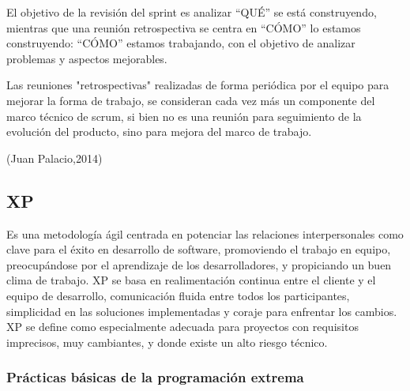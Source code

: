 	El objetivo de la revisión del sprint es analizar “QUÉ” se está construyendo, mientras que una reunión retrospectiva se centra en “CÓMO” lo estamos construyendo: “CÓMO” estamos trabajando, con el objetivo de analizar problemas y aspectos mejorables.

	Las reuniones "retrospectivas" realizadas de forma periódica por el equipo para mejorar la forma de trabajo, se consideran cada vez más un componente del marco técnico de scrum, si bien no es una reunión para seguimiento de la evolución del producto, sino para mejora del marco de trabajo.
	
	(Juan Palacio,2014)
\setlength{\parskip}{0mm}

    

\subsection{XP}
\setlength{\parskip}{5mm}
Es una metodología ágil centrada en potenciar las relaciones interpersonales como clave para el éxito en desarrollo de software, promoviendo el trabajo en equipo, preocupándose por el aprendizaje de los desarrolladores, y propiciando un buen clima de trabajo. XP se basa en realimentación continua entre el cliente y el equipo de desarrollo, comunicación fluida entre todos los participantes, simplicidad en las soluciones implementadas y coraje para enfrentar los cambios. XP se define como especialmente adecuada para proyectos con requisitos imprecisos, muy cambiantes, y donde existe un alto riesgo técnico.
\setlength{\parskip}{0mm}
\subsubsection{Prácticas básicas de la programación extrema}
\setlength{\parskip}{5mm}


